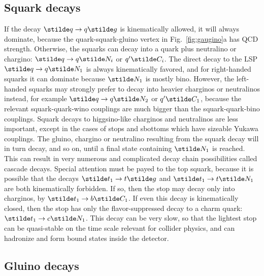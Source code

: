 \subsection{Squark decays}\label{subsec:decays.squarks}

If the decay
$
\stilde q \rightarrow q\stilde g
$
is kinematically allowed, it will always dominate, because the
quark-squark-gluino vertex in Fig.~{\ref{fig:gaugino}}a has QCD strength.
Otherwise, the
squarks can decay into a quark plus neutralino or chargino:
 $
\stilde q \rightarrow q \stilde N_i$ or $
q^\prime \stilde C_i
$.
The direct decay to the LSP $\stilde q \rightarrow
q \stilde N_1$ is always kinematically favored,
and for right-handed squarks it can dominate because
$\stilde N_1$ is mostly bino.
However, the left-handed squarks may strongly prefer to decay into
heavier charginos or neutralinos instead, for example
$\stilde q \rightarrow  q \stilde N_2$ or $q^\prime \stilde C_1$,
because the relevant squark-quark-wino couplings
are much bigger than the squark-quark-bino couplings.
Squark decays to higgsino-like charginos and neutralinos are less
important, except in the cases of stops and sbottoms which have
sizeable Yukawa couplings.
The gluino, chargino or neutralino resulting from the squark
decay will
in turn decay, and so on, until a final state containing
$\stilde N_1$ is reached. This can result in
very numerous and complicated decay chain possibilities
called cascade decays.\cite{cascades}
Special attention must be payed to the top squark, because it
is possible that the decays $\stilde t_1 \rightarrow t\stilde g$
and $\stilde t_1 \rightarrow t \stilde N_1$ are both kinematically
forbidden. If so, then the stop may decay only into charginos,
by $\stilde t_1 \rightarrow b \stilde C_1$. If even this
decay is kinematically closed, then the stop has only the
flavor-suppressed decay to a charm quark:
$
\stilde t_1\rightarrow c \stilde N_1
$.
This decay can be very slow,\cite{stoptocharmdecay} so that the lightest
stop can be
quasi-stable on the time scale relevant for collider physics,
and can hadronize and form bound states inside the detector.

\subsection{Gluino decays}\label{subsec:decays.gluino}

